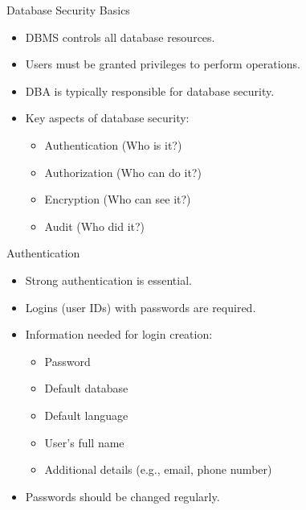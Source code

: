 \documentclass[aspectratio=169]{beamer}
\begin{document}
\begin{frame}{Database Security Basics}
  \begin{itemize}
    \item DBMS controls all database resources.
    \item Users must be granted privileges to perform operations.
    \item DBA is typically responsible for database security.
    \item Key aspects of database security:
      \begin{itemize}
        \item Authentication (Who is it?)
        \item Authorization (Who can do it?)
        \item Encryption (Who can see it?)
        \item Audit (Who did it?)
      \end{itemize}
  \end{itemize}
\end{frame}

\begin{frame}{Authentication}
  \begin{itemize}
    \item Strong authentication is essential.
    \item Logins (user IDs) with passwords are required.
    \item Information needed for login creation:
      \begin{itemize}
        \item Password
        \item Default database
        \item Default language
        \item User's full name
        \item Additional details (e.g., email, phone number)
      \end{itemize}
    \item Passwords should be changed regularly.
  \end{itemize}
\end{frame}
\end{document}
